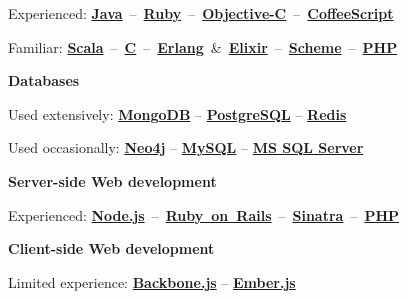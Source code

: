 \documentclass{tccv}
\begin{document}
{{\hspace{2pt}%
Experienced:
\mbox{\href{http://www.oracle.com/technetwork/java/}{\bf Java} -- %
     \href{https://www.ruby-lang.org/en/}{\bf Ruby} -- %
     \href{https://en.wikipedia.org/wiki/Objective-C}{\bf Objective-C} -- %
     \href{http://coffeescript.org}{\bf CoffeeScript}%
}

\hspace{2pt}%
Familiar:
\mbox{\href{http://www.scala-lang.org}{\bf Scala} -- %
     \href{https://en.wikipedia.org/wiki/C_(programming_language)}{\bf C} -- %
     \href{http://www.erlang.org}{\bf Erlang} \& %
     \href{http://elixir-lang.org}{\bf Elixir} --  %
     \href{http://schemers.org}{\bf Scheme} -- %
     \href{http://php.net}{\bf PHP}%
}



\vspace{9pt}%
\hspace{-1pt}%
\textsf{\textbf{Databases}}
	 
\hspace{2pt}%
Used extensively: %
     \href{http://www.mongodb.org}{\bf MongoDB} -- %
     \href{http://www.postgresql.org}{\bf PostgreSQL} -- %
     \href{http://redis.io}{\bf Redis}%

\hspace{2pt}%
Used occasionally: %
     \href{http://www.neo4j.org}{\bf Neo4j} -- %
     \href{http://www.mysql.com}{\bf MySQL} -- %
     \href{http://www.microsoft.com/en-us/sqlserver/default.aspx}{\bf MS SQL Server}%



\vspace{9pt}%
\hspace{-1pt}%
\textsf{\textbf{Server-side Web development}}
 
\hspace{2pt}%
Experienced: %
\mbox{\href{http://nodejs.org}{\bf Node.js} -- %
     \href{http://rubyonrails.org}{\bf Ruby on Rails} -- %
     \href{http://www.sinatrarb.com}{\bf Sinatra} -- %
     \href{http://php.net}{\bf PHP}%
}



\vspace{9pt}%
\hspace{-1pt}%
\textsf{\textbf{Client-side Web development}}
	 
\hspace{2pt}%
Limited experience: %
     \href{http://backbonejs.org}{\bf Backbone.js} -- %
     \href{http://emberjs.com}{\bf Ember.js}%



}}
\end{document}
